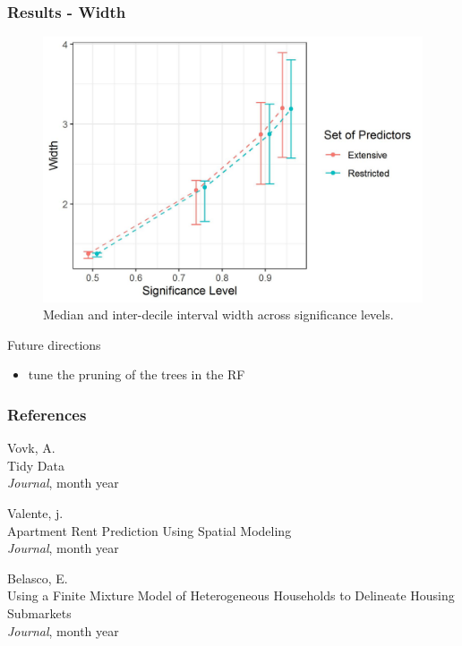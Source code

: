 \documentclass{beamer}
\begin{document}
\begin{frame} \frametitle{Results - Width}   
\begin{figure}
	\centering
	\includegraphics[scale = 0.5]{conformal.jpeg}
	\caption{Median and inter-decile interval width across significance levels.}
	\label{fig:conformal}
\end{figure}
\end{frame}

\begin{frame}
Future directions
\begin{itemize}
	\item tune the pruning of the trees in the RF
\end{itemize}
\end{frame}





\begin{frame}
\frametitle{References}
\footnotesize{
	\begin{thebibliography}{99} %
		
		 Vovk, A. \\
		\newblock Tidy Data\\
		\newblock \emph{Journal}, month year
		
		 Valente, j. \\
		\newblock Apartment Rent Prediction Using Spatial Modeling\\
		\newblock \emph{Journal}, month year
		
		 Belasco, E. \\
		\newblock Using a Finite Mixture Model of Heterogeneous Households to Delineate Housing Submarkets\\
		\newblock \emph{Journal}, month year
		
	\end{thebibliography}
}
\end{frame}
    
\end{document}
